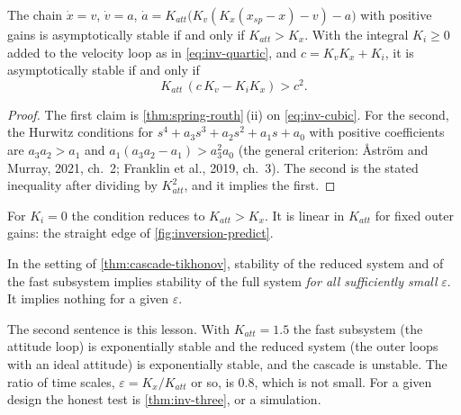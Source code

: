 \begin{theorem}
\label{thm:inv-three}
The chain $\dot x = v$, $\dot v = a$, $\dot a = K_{att}\big(K_v(K_x(x_{sp} - x) - v) - a\big)$ with positive gains is asymptotically stable if and only if $K_{att} > K_x$. With the integral $K_i \ge 0$ added to the velocity loop as in \cref{eq:inv-quartic}, and $c = K_vK_x + K_i$, it is asymptotically stable if and only if
\begin{equation*}
  K_{att}\,(c\,K_v - K_iK_x) > c^2 .
\end{equation*}
\end{theorem}
\begin{proof}
The first claim is \cref{thm:spring-routh}\,(ii) on \cref{eq:inv-cubic}. For the second, the Hurwitz conditions for $s^4 + a_3s^3 + a_2s^2 + a_1s + a_0$ with positive coefficients are $a_3a_2 > a_1$ and $a_1(a_3a_2 - a_1) > a_3^2a_0$ (the general criterion: Åström and Murray, 2021, ch.~2; Franklin et al., 2019, ch.~3). The second is the stated inequality after dividing by $K_{att}^2$, and it implies the first.
\end{proof}

For $K_i = 0$ the condition reduces to $K_{att} > K_x$. It is linear in $K_{att}$ for fixed outer gains: the straight edge of \cref{fig:inversion-predict}.

\begin{theorem}
\label{thm:inv-separation}
In the setting of \cref{thm:cascade-tikhonov}, stability of the reduced system and of the fast subsystem implies stability of the full system \emph{for all sufficiently small} $\varepsilon$. It implies nothing for a given $\varepsilon$.
\end{theorem}

The second sentence is this lesson. With $K_{att} = 1.5$ the fast subsystem (the attitude loop) is exponentially stable and the reduced system (the outer loops with an ideal attitude) is exponentially stable, and the cascade is unstable. The ratio of time scales, $\varepsilon = K_x/K_{att}$ or so, is 0.8, which is not small. For a given design the honest test is \cref{thm:inv-three}, or a simulation.

